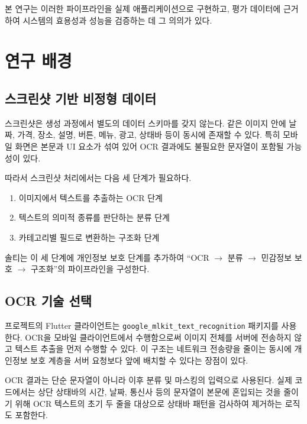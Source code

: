 \documentclass[11pt,a4paper]{article}
\begin{document}
본 연구는 이러한 파이프라인을 실제 애플리케이션으로 구현하고, 평가 데이터에 근거하여 시스템의 효용성과 성능을 검증하는 데 그 의의가 있다.

\newpage

\section{연구 배경}

\subsection{스크린샷 기반 비정형 데이터}

스크린샷은 생성 과정에서 별도의 데이터 스키마를 갖지 않는다. 같은 이미지 안에 날짜, 가격, 장소, 설명, 버튼, 메뉴, 광고, 상태바 등이 동시에 존재할 수 있다\cite{ref_screenseg}. 특히 모바일 화면은 본문과 UI 요소가 섞여 있어 OCR 결과에도 불필요한 문자열이 포함될 가능성이 있다.

따라서 스크린샷 처리에서는 다음 세 단계가 필요하다.

\begin{enumerate}
    \item 이미지에서 텍스트를 추출하는 OCR 단계
    \item 텍스트의 의미적 종류를 판단하는 분류 단계
    \item 카테고리별 필드로 변환하는 구조화 단계
\end{enumerate}

솔티는 이 세 단계에 개인정보 보호 단계를 추가하여 ``OCR $\rightarrow$ 분류 $\rightarrow$ 민감정보 보호 $\rightarrow$ 구조화''의 파이프라인을 구성한다.

\subsection{OCR 기술 선택}

프로젝트의 Flutter 클라이언트는 \texttt{google\_mlkit\_text\_recognition} 패키지를 사용한다. OCR을 모바일 클라이언트에서 수행함으로써 이미지 전체를 서버에 전송하지 않고 텍스트 추출을 먼저 수행할 수 있다. 이 구조는 네트워크 전송량을 줄이는 동시에 개인정보 보호 계층을 서버 요청보다 앞에 배치할 수 있다는 장점이 있다.

OCR 결과는 단순 문자열이 아니라 이후 분류 및 마스킹의 입력으로 사용된다. 실제 코드에서는 상단 상태바의 시간, 날짜, 통신사 등의 문자열이 본문에 혼입되는 것을 줄이기 위해 OCR 텍스트의 초기 두 줄을 대상으로 상태바 패턴을 검사하여 제거하는 로직도 포함한다.
\end{document}
